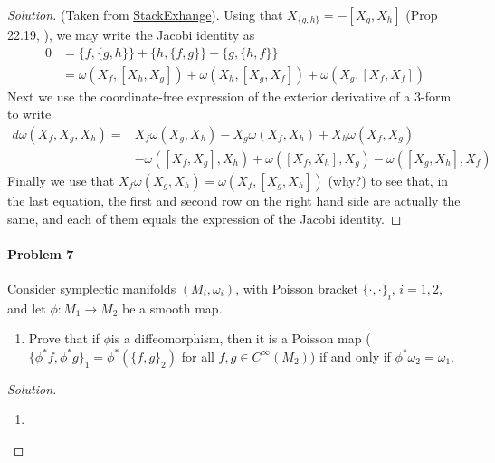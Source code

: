 \begin{proof}[Solution]\leavevmode
	(Taken from \href{https://math.stackexchange.com/questions/1692891/how-to-show-that-jacobi-identity-for-is-equivalent-to-omega-being-clo}{StackExhange}). Using that $X_{\{g,h\}} =-[X_g,X_h]$ (Prop 22.19, \cite{lee} ), we may write the Jacobi identity as
	\begin{align*}
		0&=\{f,\{g,h\}\}+\{h,\{f,g\}\} +\{g,\{h,f\}\} \\
		 &=\omega(X_f,[X_h,X_g])+\omega(X_h,[X_g,X_f])+\omega(X_g,[X_f,X_f])
	\end{align*}
	Next we use the coordinate-free expression of the exterior derivative of a 3-form to write
	\begin{align*}
		d\omega(X_f,X_g,X_h)=&X_f\omega(X_g,X_h)-X_g\omega(X_f,X_h)+X_h\omega(X_f,X_g)\\
				     &-\omega([X_f,X_g],X_h)+\omega([X_f,X_h],X_g)-\omega([X_g,X_h],X_f)
	\end{align*}
	Finally we use that $X_f\omega(X_g,X_h)=\omega(X_f,[X_g,X_h])$ ({\color{magenta}why?)} to see that, in the last equation, the first and second row on the right hand side are actually the same, and each of them equals the expression of the Jacobi identity.
\end{proof}

\paragraph{Problem 7} Consider symplectic manifolds $(M_i,\omega_i)$, with Poisson bracket $\{\cdot ,\cdot \}_{i}$, $i=1,2$, and let  $\phi:M_1\to M_2$ be a smooth map.
\begin{enumerate}[label=\alph*.]
	\item Prove that if $\phi$is a diffeomorphism, then it is a Poisson map ($\{\phi^*f,\phi^*g\}_1=\phi^* (\{f,g\}_2)$ for all $f,g\in C^\infty(M_2)$) if and only if $\phi^*\omega_2=\omega_1$.
\end{enumerate}

\begin{proof}[Solution]\leavevmode
	\begin{enumerate}[label=\alph*.]
		\item 
	\end{enumerate}
\end{proof}


